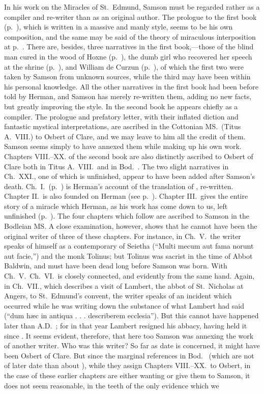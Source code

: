 \documentclass[10pt]{book}
\begin{document}
{\noindent In his work on the Miracles of St.\ Edmund, Samson must be regarded rather as a compiler and re-writer than as an original author. The prologue to the first book (p.\ ), which is written in a massive and manly style, seems to be his own composition, and the same may be said of the theory of miraculous interposition at p.\ . There are, besides, three narratives in the first book,---those of the blind man cured in the wood of Hoxne (p.\ ), the dumb girl who recovered her speech at the shrine (p.\ ), and William de Curzun (p.\ ), of which the first two were taken by Samson from unknown sources, while the third may have been within his personal knowledge. All the other narratives in the first book had been before told by Herman, and Samson has merely re-written them, adding no new facts, but greatly improving the style. In the second book he appears chiefly as a compiler. The prologue and prefatory letter, with their inflated diction and fantastic mystical interpretations, are ascribed in the Cottonian MS.\ (Titus A.\ VIII.) to Osbert of Clare, and we may leave to him all the credit of them. Samson seems simply to have annexed them while making up his own work. Chapters VIII.--XX. of the second book are also distinctly ascribed to Osbert of Clare both in Titus A.\ VIII.\ and in Bod.\ . The two slight narratives in Ch.\ XXI., one of which is unfinished, appear to have been added after Samson's death. Ch.\ I.\ (p.\ ) is Herman's account of the translation of , re-written. Chapter II.\ is also founded on Herman (see p.\ ). Chapter III.\ gives the entire story of a miracle which Herman, as his work has come down to us, left unfinished (p.\ ). The four chapters which follow are ascribed to Samson in the Bodleian MS. A close examination, however, shows that he cannot have been the original writer of three of these chapters. For instance, in Ch.\ V.\ the writer speaks of himself as a contemporary of Seietha (``Multi mecum aut fama norunt aut facie,'') and the monk Tolinus; but Tolinus was sacrist in the time of Abbot Baldwin, and must have been dead long before Samson was born. With Ch.\ V.\ Ch.\ VI.\ is closely connected, and evidently from the same hand. Again, in Ch.\ VII., which describes a visit of Lambert, the abbot of St.\ Nicholas at Angers, to St.\ Edmund's convent, the writer speaks of an incident which occurred while he was writing down the substance of what Lambert had said (``dum h\ae{}c in antiqua . . .  describerem ecclesia''). But this cannot have happened later than \textsc{A.D}.\ ; for in that year Lambert resigned his abbacy, having held it since . It seems evident, therefore, that here too Samson was annexing the work of another writer. Who was this writer? So far as date is concerned, it might have been Osbert of Clare. But since the marginal references in Bod.\  (which are not of later date than about ), while they assign Chapters VIII.--XX.\ to Osbert, in the case of these earlier chapters are either wanting or give them to Samson, it does not seem reasonable, in the teeth of the only evidence which we }
\end{document}
